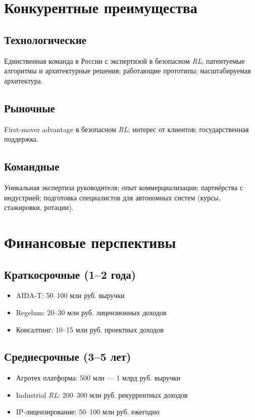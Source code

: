 \documentclass[12pt,a4paper]{article}
\begin{document}
\section{Конкурентные преимущества}
\subsection*{Технологические}
Единственная команда в России с экспертизой в безопасном \textit{RL}; патентуемые алгоритмы и архитектурные решения; работающие прототипы; масштабируемая архитектура.

\subsection*{Рыночные}
First-mover advantage в безопасном \textit{RL}; интерес от клиентов; государственная поддержка.

\subsection*{Командные}
Уникальная экспертиза руководителя; опыт коммерциализации; партнёрства с индустрией; подготовка специалистов для автономных систем (курсы, стажировки, ротации).

\section{Финансовые перспективы}
\subsection*{Краткосрочные (1–2 года)}
\begin{itemize}
    \item AIDA-T: 50–100 млн руб. выручки
    \item Regelum: 20–30 млн руб. лицензионных доходов
    \item Консалтинг: 10–15 млн руб. проектных доходов
\end{itemize}
\subsection*{Среднесрочные (3–5 лет)}
\begin{itemize}
    \item Агротех платформа: 500 млн --- 1 млрд руб. выручки
    \item Industrial \textit{RL}: 200–300 млн руб. рекуррентных доходов
    \item IP-лицензирование: 50–100 млн руб. ежегодно
\end{itemize}
\end{document}
